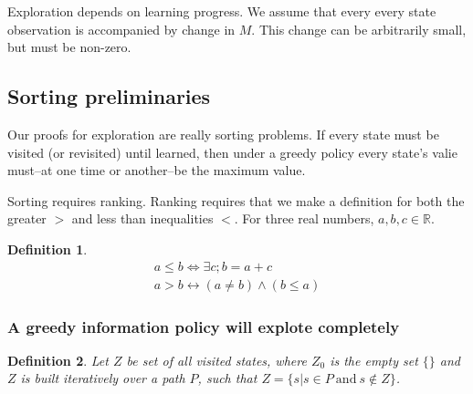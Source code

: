\documentclass[9pt,twocolumn,twoside]{pnas-new}
\newtheorem{definition}{Definition}
\begin{document}

Exploration depends on learning progress. We assume that every every state observation is accompanied by change in $M$. This change can be arbitrarily small, but must be non-zero. 

\subsection*{Sorting preliminaries}
Our proofs for exploration are really sorting problems. If every state must be visited (or revisited) until learned, then under a greedy policy every state's valie must--at one time or another--be the maximum value. 

Sorting requires ranking. Ranking requires that we make a definition for both the greater $>$ and less than inequalities $<$. For three real numbers, ${a,b,c} \in \mathbb{R}$.

\begin{definition} \label{def:ineq}
    \begin{align}
        a \leq b \Leftrightarrow \exists c; b = a + c \\
        a > b \leftrightarrow (a \neq b) \wedge (b \leq a) 
    \end{align}
\end{definition}

\subsubsection*{A greedy information policy will explote completely}


\begin{definition}
    Let $Z$ be set of all visited states, where $Z_0$ is the empty set $\{\}$ and $Z$ is built iteratively over a path $P$, such that $Z = \{s | s \in P\ \text{and}\ s \not\in Z\}$.    
\end{definition}
\end{document}
